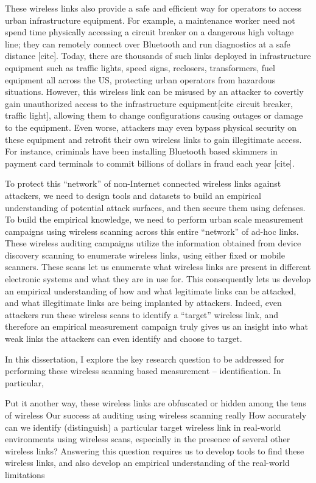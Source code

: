 These wireless links also provide a safe and efficient way for operators to access urban infrastructure equipment. For example, a maintenance worker need not spend time physically accessing a circuit breaker on a dangerous high voltage line; they can remotely connect over Bluetooth and run diagnostics at a safe distance [cite]. Today, there are thousands of such links deployed in infrastructure equipment such as traffic lights, speed signs, reclosers, transformers, fuel equipment all across the US, protecting urban operators from hazardous situations. However, this wireless link can be misused by an attacker to covertly gain unauthorized access to the infrastructure equipment[cite circuit breaker, traffic light], allowing them to change configurations causing outages or damage to the equipment. Even worse, attackers may even bypass physical security on these equipment and retrofit their own wireless links to gain illegitimate access. For instance, criminals have been installing Bluetooth based skimmers in payment card terminals to commit billions of dollars in fraud each year [cite].

To protect this “network” of non-Internet connected wireless links against attackers, we need to design tools and datasets to build an empirical understanding of potential attack surfaces, and then secure them using defenses. To build the empirical knowledge, we need to perform urban scale measurement campaigns using wireless scanning across this entire “network” of ad-hoc links. These wireless auditing campaigns utilize the information obtained from device discovery scanning to enumerate wireless links, using either fixed or mobile scanners. These scans let us enumerate what wireless links are present in different electronic systems and what they are in use for. This consequently lets us develop an empirical understanding of how and what legitimate links can be attacked, and what illegitimate links are being implanted by attackers. Indeed, even attackers run these wireless scans to identify a “target” wireless link, and therefore an empirical measurement campaign truly gives us an insight into what weak links the attackers can even identify and choose to target.

In this dissertation, I explore the key research question to be addressed for performing these wireless scanning based measurement – identification. In particular,

Put it another way, these wireless links are obfuscated or hidden among the tens of wireless
Our success at auditing using wireless scanning really 
How accurately can we identify (distinguish) a particular target wireless link in real-world environments using wireless scans, especially in the presence of several other wireless links? Answering this question requires us to develop tools to find these wireless links, and also develop an empirical understanding of the real-world limitations

